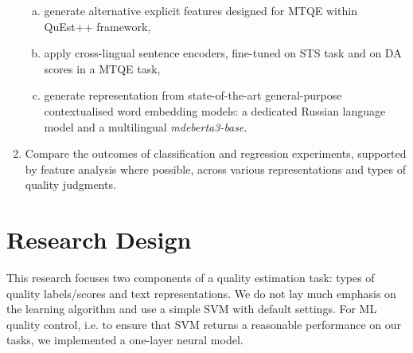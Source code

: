 \begin{enumerate}
\begin{enumerate}[(a)]
		\item generate alternative explicit features designed for \gls*{MTQE} within QuEst++ framework, 
		\item apply cross-lingual sentence encoders, fine-tuned on \gls{STS} task and on DA scores in a \gls*{MTQE} task, %
		\item generate representation from state-of-the-art general-purpose contextualised word embedding models: a dedicated Russian language model and a multilingual \textit{mdeberta3-base}.
	\end{enumerate} 
	\item Compare the outcomes of classification and regression experiments, supported by feature analysis where possible, across various representations and types of quality judgments.
\end{enumerate}

\section{\label{ssec:design}Research Design} 
This research focuses two components of a quality estimation task: types of quality labels/scores and text representations. We do not lay much emphasis on the learning algorithm and use a simple \gls{SVM} with default settings. For ML quality control, i.e. to ensure that SVM returns a reasonable performance on our tasks, we implemented a one-layer neural model.

